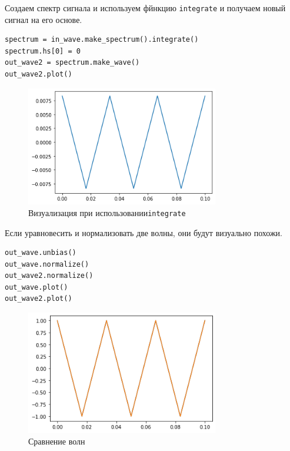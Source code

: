 \documentclass[a4paper,12pt]{report}
\begin{document}
Создаем спектр сигнала и используем фйнкцию \texttt{integrate} и получаем новый сигнал на его основе.

\begin{lstlisting}[caption=Визуализация при \texttt{integrate}]
spectrum = in_wave.make_spectrum().integrate()
spectrum.hs[0] = 0
out_wave2 = spectrum.make_wave()
out_wave2.plot()
\end{lstlisting}

\begin{figure}[H]
        \centering
        \includegraphics[width=0.75\textwidth]{6.png}
        \caption{Визуализация при использовании\texttt{integrate}}
        \label{6}
\end{figure}

Если уравновесить и нормализовать две волны, они будут визуально похожи.

\begin{lstlisting}[caption=Сравнение волн]
out_wave.unbias()
out_wave.normalize()
out_wave2.normalize()
out_wave.plot()
out_wave2.plot()
\end{lstlisting}

\begin{figure}[H]
        \centering
        \includegraphics[width=0.75\textwidth]{7.png}
        \caption{Сравнение волн}
        \label{7}
\end{figure}
\end{document}
